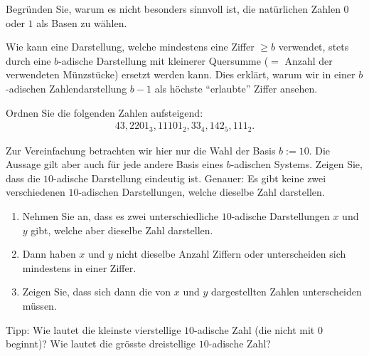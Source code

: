 \begin{myexercise}
  Begründen Sie, warum es nicht besonders sinnvoll ist, die natürlichen Zahlen $0$ oder $1$ als Basen zu wählen.
\end{myexercise}

\begin{mychallenge}
  Wie kann eine Darstellung, welche mindestens eine Ziffer $\geq b$ verwendet, stets durch eine
  $b$-adische Darstellung mit kleinerer Quersumme ($=$ Anzahl der verwendeten Münzstücke) ersetzt werden kann.
  Dies erklärt, warum wir in einer $b$-adischen Zahlendarstellung $b-1$ als höchste \enquote{erlaubte} Ziffer ansehen. 
\end{mychallenge}

\begin{myexercise}
  Ordnen Sie die folgenden Zahlen aufsteigend:
  \begin{align*}
    43, 2201_3, 11101_2, 33_4, 142_5, 111_2.
  \end{align*}
\end{myexercise}

\begin{mychallenge}
  Zur Vereinfachung betrachten wir hier nur die Wahl der Basis $b := 10$. Die Aussage gilt aber auch für jede andere
  Basis eines $b$-adischen Systems. Zeigen Sie, dass die $10$-adische Darstellung eindeutig ist. Genauer: Es gibt keine
  zwei verschiedenen $10$-adischen Darstellungen, welche dieselbe Zahl darstellen.
  \begin{enumerate}
    \item Nehmen Sie an, dass es zwei unterschiedliche $10$-adische Darstellungen $x$ und $y$ gibt, welche aber dieselbe
      Zahl darstellen.    
    \item Dann haben $x$ und $y$ nicht dieselbe Anzahl Ziffern oder unterscheiden sich mindestens in einer Ziffer.
    \item Zeigen Sie, dass sich dann die von $x$ und $y$ dargestellten Zahlen unterscheiden müssen. 
  \end{enumerate}
  Tipp: Wie lautet die kleinste vierstellige $10$-adische Zahl (die nicht mit $0$ beginnt)? Wie lautet die grösste
  dreistellige $10$-adische Zahl? 
\end{mychallenge}

